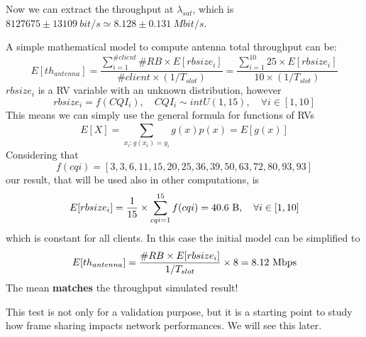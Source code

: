 Now we can extract the throughput at \(\lambda_{sat}\), which is \(8127675 \pm 13109\ bit/s \simeq 8.128 \pm 0.131\ Mbit/s\).

A simple mathematical model to compute antenna total throughput can be:
\begin{equation}
	E[th_{antenna}] = \frac{\sum\limits_{i=1}^{\#client} \#RB \times E[rbsize_i]}{\#client\times(1/T_{slot})} = \frac{\sum\limits_{i=1}^{10} 25 \times E[rbsize_i]}{10 \times (1/T_{slot})}
\end{equation}
\(rbsize_i\) is a RV variable with an unknown distribution, however
\begin{equation}
	 rbsize_i = f(CQI_i), \quad CQI_i\sim intU(1,15), \quad \forall i \in [1,10]
\end{equation}
This means we can simply use the general formula for functions of RVs
\begin{equation}
	E[X] = \sum_{x_i : g(x_i)=y_i}^{} g(x)p(x) = E[g(x)]
\end{equation}
Considering that
\[f(cqi) = [3,3,6,11,15,20,25,36,39,50,63,72,80,93,93] \]
our result, that will be used also in other computations, is
\begin{equation}
	E[rbsize_i] = \frac{1}{15} \times \sum_{cqi=1}^{15} f(cqi) = 40.6 \textnormal{ B}, \quad \forall i \in [1,10]
\end{equation}
which is constant for all clients. In this case the initial model can be simplified to
\begin{equation}
E[th_{antenna}] = \frac{\#RB \times E[rbsize_i]}{1/T_{slot}} \times 8 = 8.12 \textnormal{ Mbps}
\end{equation}
The mean \textbf{matches} the throughput simulated result!

This test is not only for a validation purpose, but it is a starting point to study how frame sharing impacts network performances. We will see this later.